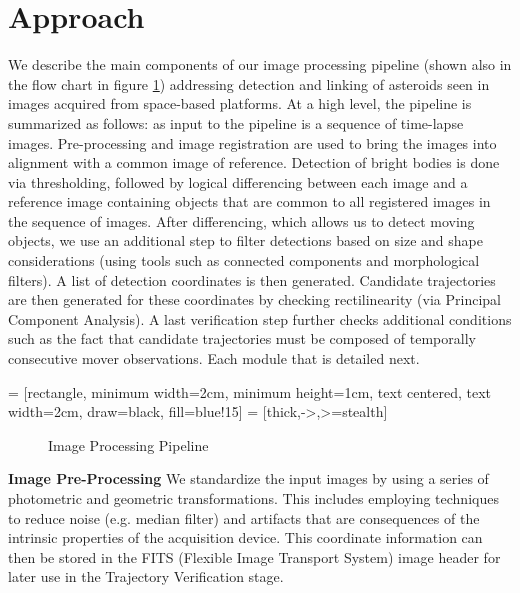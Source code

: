 \documentclass{article}
\begin{document}
\section{Approach}
\label{sec:approach}

We describe the main components of our image processing pipeline (shown also in the flow chart in figure \ref{IPP}) addressing detection and linking of asteroids seen in images acquired from space-based platforms.  At a high level, the pipeline is summarized as follows: as input to the pipeline is a sequence of time-lapse images. Pre-processing and image registration are used to bring the images into alignment with a common image of reference.  Detection of bright bodies is done via thresholding, followed by logical differencing between each image and a reference image containing objects that are common to all registered images in the sequence of images.  After differencing, which allows us to detect moving objects, we use an additional step to filter detections based on size and shape considerations (using tools such as connected components and morphological filters).  A list of detection coordinates is then generated.  Candidate trajectories are then generated for these coordinates by checking rectilinearity (via Principal Component Analysis).  A last verification step further checks additional conditions such as the fact that candidate trajectories must be composed of temporally consecutive mover observations.  Each module that is detailed next. 

 = [rectangle, minimum width=2cm, minimum height=1cm, text centered, text width=2cm, draw=black, fill=blue!15]
 = [thick,->,>=stealth]
\begin{figure}[b]
\caption{Image Processing Pipeline}
\label{IPP}
\end{figure}

{\bf Image Pre-Processing}
We standardize the input images by using a series of photometric and geometric transformations.  This includes employing techniques to reduce noise (e.g. median filter) and artifacts that are consequences of the intrinsic properties of the acquisition device.   This coordinate information can then be stored in the FITS (Flexible Image Transport System) image header for later use in the Trajectory Verification stage.
\end{document}
